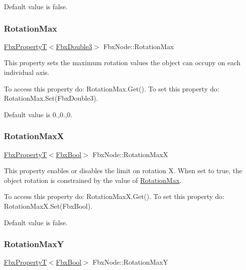 Default value is false. \mbox{\label{class_fbx_node_a04c8e5651641fbfafaa2adb18be50696}} 
\subsubsection{\texorpdfstring{Rotation\+Max}{RotationMax}}
{\footnotesize\ttfamily \hyperlink{class_fbx_property_t}{Fbx\+PropertyT}$<$\hyperlink{fbxtypes_8h_ae0a96f14cde566774c7553aa7523b7a7}{Fbx\+Double3}$>$ Fbx\+Node\+::\+Rotation\+Max}

This property sets the maximum rotation values the object can occupy on each individual axis.

To access this property do\+: Rotation\+Max.\+Get(). To set this property do\+: Rotation\+Max.\+Set(\+Fbx\+Double3).

Default value is 0.,0.,0. \mbox{\label{class_fbx_node_a727d3f12af78c3ae37e77b5d87c97f79}} 
\subsubsection{\texorpdfstring{Rotation\+MaxX}{RotationMaxX}}
{\footnotesize\ttfamily \hyperlink{class_fbx_property_t}{Fbx\+PropertyT}$<$\hyperlink{fbxtypes_8h_a92e0562b2fe33e76a242f498b362262e}{Fbx\+Bool}$>$ Fbx\+Node\+::\+Rotation\+MaxX}

This property enables or disables the limit on rotation X. When set to {\ttfamily true}, the object rotation is constrained by the value of \hyperlink{class_fbx_node_a04c8e5651641fbfafaa2adb18be50696}{Rotation\+Max}.

To access this property do\+: Rotation\+Max\+X.\+Get(). To set this property do\+: Rotation\+Max\+X.\+Set(\+Fbx\+Bool).

Default value is false. \mbox{\label{class_fbx_node_a4182202837129c1e05f5dba5b37cb8c6}} 
\subsubsection{\texorpdfstring{Rotation\+MaxY}{RotationMaxY}}
{\footnotesize\ttfamily \hyperlink{class_fbx_property_t}{Fbx\+PropertyT}$<$\hyperlink{fbxtypes_8h_a92e0562b2fe33e76a242f498b362262e}{Fbx\+Bool}$>$ Fbx\+Node\+::\+Rotation\+MaxY}

